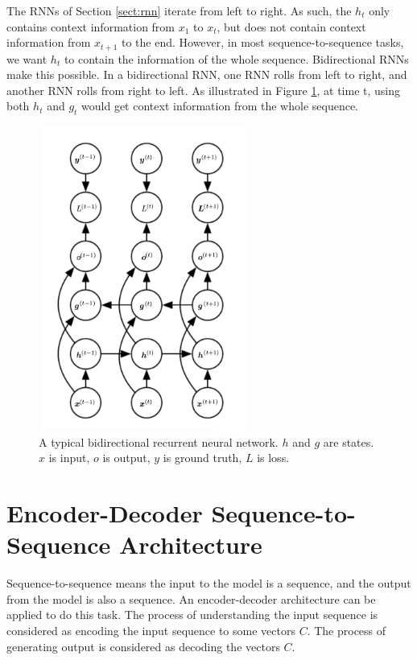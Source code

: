 \documentclass[modernstyle,12pt]{sjsuthesis}
\theoremstyle{definition}
\begin{document}
The RNNs of Section \ref{sect:rnn}
iterate from left to right. As such, the $h_t$ only contains context information from $x_1$ to $x_t$, but does not contain context information from $x_{t+1}$ to the end. However, in most sequence-to-sequence tasks, we want $h_t$ to contain the information of the whole sequence. Bidirectional RNNs make this possible. In a bidirectional RNN, one RNN rolls from left to right, and another RNN rolls from right to left. As illustrated in Figure \ref{f:bidirectionalRnn}, at time t, using both $h_t$ and $g_t$ would get context information from the whole sequence.

\begin{figure}[htbp]\centering
  \includegraphics[width=7cm, height=10cm]{figures/bidirectionalRnn}
  \caption{A typical bidirectional recurrent neural network. $h$ and $g$ are states. $x$ is input, $o$ is output, $y$ is ground truth, $L$ is loss.\cite{goodfellow2016deep}}
  \label{f:bidirectionalRnn}
\end{figure}

\section{Encoder-Decoder Sequence-to-Sequence Architecture}

Sequence-to-sequence means the input to the model is a sequence, and the output from the model is also a sequence. An encoder-decoder architecture can be applied to do this task. The process of understanding the input sequence is considered as encoding the input sequence to some vectors $C$. The process of generating output is considered as decoding the vectors $C$.
\end{document}
